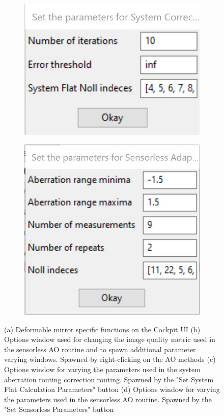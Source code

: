 \begin{figure}[H]
	\begin{subfigure}{0.45\textwidth}
		\centering
		\includegraphics[width=\linewidth]{images/direct_wavefront_sensing_options.jpg}
		\caption{}
		\label{fig:DM_direct_wavefront_sensing_options}
	\end{subfigure}
	\begin{subfigure}{0.35\textwidth}
		\centering
		\includegraphics[width=\linewidth]{images/sensorless_ao_parameters.jpg}
		\caption{}
		\label{fig:DM_sensorless_ao_parameters}
	\end{subfigure}
	\caption{(a) Deformable mirror specific functions on the Cockpit UI (b) Options window used for changing the image quality metric used in the sensorless AO routine and to spawn additional parameter varying windows. Spawned by right-clicking on the AO methods (c) Options window for varying the parameters used in the system aberration routing correction routing. Spawned by the "Set System Flat Calculation Parameters" button (d) Options window for varying the parameters used in the sensorless AO routine. Spawned by the "Set Sensorless Parameters" button}
	\label{fig:DeepSIM_control_software}
\end{figure}


